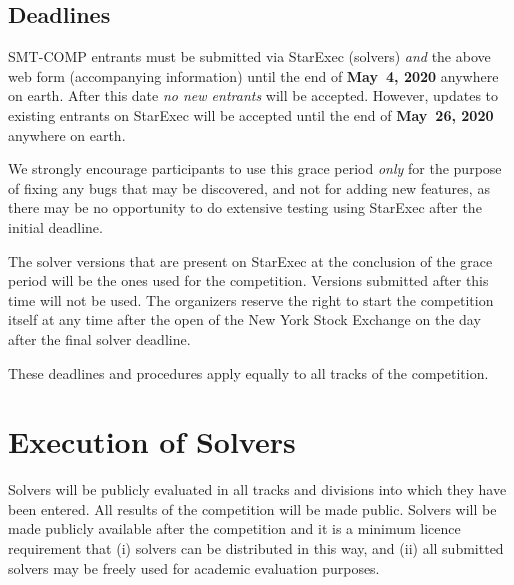 \documentclass[12pt]{article}
\newcommand{\rem}[1]{\textcolor{red}{[#1]}}
\newcommand{\an}[1]{\rem{#1 -- aina}}
\begin{document}
%


\subsection*{Deadlines}

SMT-COMP entrants must be submitted via StarExec (solvers) \emph{and}
the above web form (accompanying information) until the end of
{\bf May~4, 2020} anywhere on earth.
After this date \emph{no new entrants} will be accepted.
However, updates to existing entrants on StarExec
will be accepted until the end of {\bf May~26, 2020} anywhere on earth.

We strongly encourage participants to use this grace period
\emph{only} for the purpose of fixing any bugs that may be discovered,
and not for adding new features, as there may be no opportunity to do
extensive testing using StarExec after the initial deadline.

The solver versions that are present on StarExec at the conclusion of
the grace period will be the ones used for the competition.  Versions
submitted after this time will not be used.  The organizers reserve
the right to start the competition itself at any time after the open
of the New York Stock Exchange on the day after the final solver
deadline.

These deadlines and procedures apply equally to all tracks of the
competition.




\section{Execution of Solvers}

Solvers will be publicly evaluated in all tracks and divisions into
which they have been entered.  All results of the competition will be
made public. Solvers will be made publicly available after the competition and it is a minimum licence requirement that (i) solvers can be distributed in this way, and (ii) all submitted solvers may be freely used for academic evaluation purposes.

\end{document}
